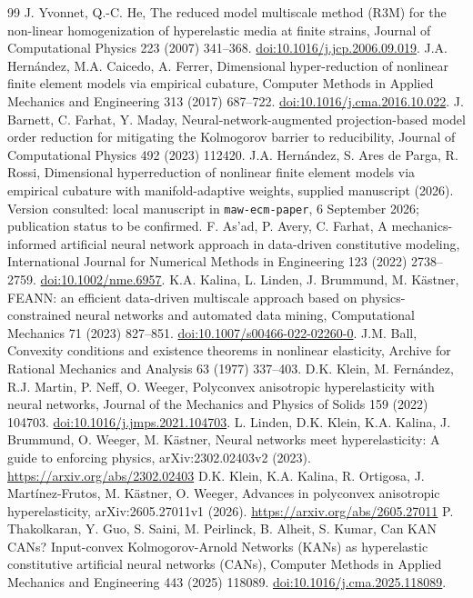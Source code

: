 \documentclass[10pt,a4paper]{article}
\newcommand{\doi}[1]{\href{https://doi.org/#1}{doi:#1}.}
\begin{document}
\begin{thebibliography}{99}
 J. Yvonnet, Q.-C. He, The reduced model multiscale method (R3M) for the non-linear homogenization of hyperelastic media at finite strains, Journal of Computational Physics 223 (2007) 341--368. \doi{10.1016/j.jcp.2006.09.019}
 J.A. Hern\'andez, M.A. Caicedo, A. Ferrer, Dimensional hyper-reduction of nonlinear finite element models via empirical cubature, Computer Methods in Applied Mechanics and Engineering 313 (2017) 687--722. \doi{10.1016/j.cma.2016.10.022}
 J. Barnett, C. Farhat, Y. Maday, Neural-network-augmented projection-based model order reduction for mitigating the Kolmogorov barrier to reducibility, Journal of Computational Physics 492 (2023) 112420.
 J.A. Hern\'andez, S. Ares de Parga, R. Rossi, Dimensional hyperreduction of nonlinear finite element models via empirical cubature with manifold-adaptive weights, supplied manuscript (2026). Version consulted: local manuscript in \texttt{maw-ecm-paper}, 6 September 2026; publication status to be confirmed.
 F. As'ad, P. Avery, C. Farhat, A mechanics-informed artificial neural network approach in data-driven constitutive modeling, International Journal for Numerical Methods in Engineering 123 (2022) 2738--2759. \doi{10.1002/nme.6957}
 K.A. Kalina, L. Linden, J. Brummund, M. K\"astner, FEANN: an efficient data-driven multiscale approach based on physics-constrained neural networks and automated data mining, Computational Mechanics 71 (2023) 827--851. \doi{10.1007/s00466-022-02260-0}
 J.M. Ball, Convexity conditions and existence theorems in nonlinear elasticity, Archive for Rational Mechanics and Analysis 63 (1977) 337--403.
 D.K. Klein, M. Fern\'andez, R.J. Martin, P. Neff, O. Weeger, Polyconvex anisotropic hyperelasticity with neural networks, Journal of the Mechanics and Physics of Solids 159 (2022) 104703. \doi{10.1016/j.jmps.2021.104703}
 L. Linden, D.K. Klein, K.A. Kalina, J. Brummund, O. Weeger, M. K\"astner, Neural networks meet hyperelasticity: A guide to enforcing physics, arXiv:2302.02403v2 (2023). \url{https://arxiv.org/abs/2302.02403}
 D.K. Klein, K.A. Kalina, R. Ortigosa, J. Mart\'inez-Frutos, M. K\"astner, O. Weeger, Advances in polyconvex anisotropic hyperelasticity, arXiv:2605.27011v1 (2026). \url{https://arxiv.org/abs/2605.27011}
 P. Thakolkaran, Y. Guo, S. Saini, M. Peirlinck, B. Alheit, S. Kumar, Can KAN CANs? Input-convex Kolmogorov-Arnold Networks (KANs) as hyperelastic constitutive artificial neural networks (CANs), Computer Methods in Applied Mechanics and Engineering 443 (2025) 118089. \doi{10.1016/j.cma.2025.118089}

\end{thebibliography}
\end{document}
